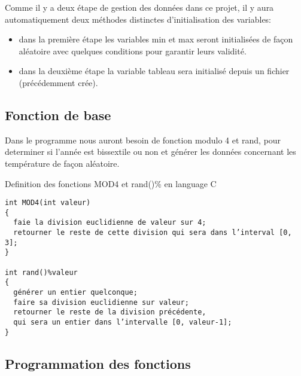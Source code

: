 Comme il y a deux étape de gestion des données dans ce projet, il y aura automatiquement deux méthodes distinctes d’initialisation des variables:

\begin{itemize}
  \item dans la première étape les variables min et max seront initialisées de façon aléatoire avec quelques conditions pour garantir leurs validité.
  \item dans la deuxième étape la variable tableau sera initialisé depuis un fichier (précédemment crée).
\end{itemize}

\subsection{Fonction de base}

Dans le programme nous auront besoin de fonction modulo 4 et rand, pour determiner si l’année
 est bissextile ou non et générer les données concernant les température de façon aléatoire.

Definition des fonctions MOD4 et rand()\% en language C

\begin{lstlisting}
int MOD4(int valeur)
{
  faie la division euclidienne de valeur sur 4;
  retourner le reste de cette division qui sera dans l’interval [0, 3];
}

int rand()%valeur
{
  générer un entier quelconque;
  faire sa division euclidienne sur valeur;
  retourner le reste de la division précédente, 
  qui sera un entier dans l’intervalle [0, valeur-1];
}
\end{lstlisting}

\subsection{Programmation des fonctions}

